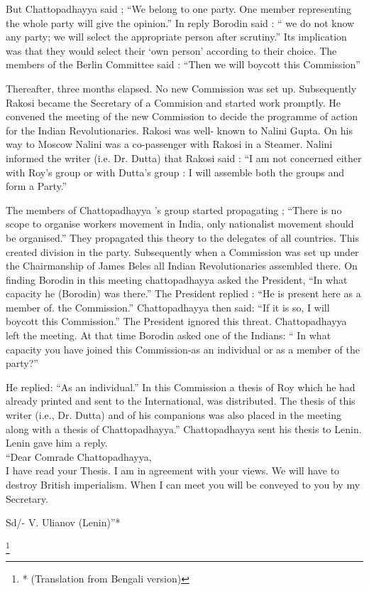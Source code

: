But Chattopadhayya said ; “We belong to one party. One member representing the whole party will give the opinion.” In reply Borodin said : “ we do not know any party; we will select the appropriate person after scrutiny.” Its implication was that they would select their ‘own person’ 
according to their choice. The members of the Berlin Committee said : “Then we will boycott this Commission” 

Thereafter, three months elapsed. No new Commission was set up. Subsequently Rakosi became the Secretary of a Commision and started work promptly. He convened the meeting of the new Commission to decide the programme of action for the Indian Revolutionaries. Rakosi was well- 
known to Nalini Gupta. On his way to Moscow Nalini was a co-passenger with Rakosi in a Steamer. Nalini informed the writer (i.e. Dr. Dutta) that Rakosi said : “I am not concerned either with Roy’s group or with Dutta’s group : I will assemble both the groups and form a Party.” 

The members of Chattopadhayya ’s group started propagating ; “There is no scope to organise workers movement in India, only nationalist movement should be organised.” They propagated this theory to the delegates of all countries. This created division in the party. Subsequently when a Commission was set up under the Chairmanship of James Beles all Indian Revolutionaries assembled there. On finding Borodin in this meeting chattopadhayya asked the President, “In what capacity he (Borodin) was there.” The President replied : “He is present here as a member of. the Commission.” Chattopadhayya then said: “If it is so, I will boycott this Commission.” The President ignored this threat. Chattopadhayya left the meeting. At that time Borodin asked one of the Indians: “ In what capacity you have joined this Commission-as an individual or as a member of the party?” 

He replied: “As an individual.” In this Commission a thesis of Roy which he had already printed and sent to the International, was distributed. The thesis of this writer (i.e., Dr. Dutta) and of his companions was also placed in the meeting along with a thesis of Chattopadhayya.” Chattopadhayya sent his thesis to Lenin. Lenin gave him a reply. \\



“Dear Comrade Chattopadhayya, \\
\indent I have read your Thesis. I am in agreement with your views. We will have to destroy British imperialism. When I can meet you will be conveyed to you by my Secretary. 
\begin{flushright}
Sd/- V. Ulianov (Lenin)”*
\end{flushright} 
\footnote{* (Translation from Bengali version) }

